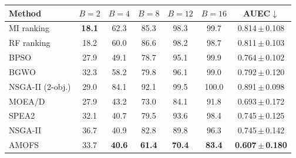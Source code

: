 \begin{tabular}{lcccccc}
\toprule
Method & $B=2$ & $B=4$ & $B=8$ & $B=12$ & $B=16$ & AUEC$\downarrow$ \\
\midrule
MI ranking & \textbf{18.1} & 62.3 & 85.3 & 98.3 & 99.7 & 0.814\,$\pm$\,0.108 \\
RF ranking & 18.2 & 60.0 & 86.6 & 98.2 & 98.7 & 0.811\,$\pm$\,0.103 \\
BPSO & 27.9 & 49.1 & 78.7 & 95.1 & 99.9 & 0.764\,$\pm$\,0.102 \\
BGWO & 32.3 & 58.2 & 79.8 & 96.1 & 99.0 & 0.792\,$\pm$\,0.120 \\
NSGA-II (2-obj.) & 29.0 & 84.1 & 92.1 & 99.5 & 100.0 & 0.891\,$\pm$\,0.098 \\
MOEA/D & 27.9 & 43.2 & 73.0 & 84.1 & 91.8 & 0.693\,$\pm$\,0.172 \\
SPEA2 & 32.1 & 40.7 & 79.5 & 93.6 & 98.4 & 0.745\,$\pm$\,0.125 \\
NSGA-II & 36.7 & 40.9 & 82.8 & 89.8 & 96.3 & 0.745\,$\pm$\,0.142 \\
AMOFS & 33.7 & \textbf{40.6} & \textbf{61.4} & \textbf{70.4} & \textbf{83.4} & \textbf{0.607\,$\pm$\,0.180} \\
\bottomrule
\end{tabular}
